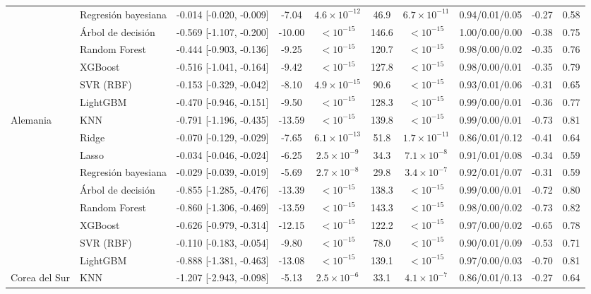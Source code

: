 \begin{longtable}{llcccccccc}
 & Regresión bayesiana & -0.014 [-0.020, -0.009] & -7.04 & $4.6\times10^{-12}$ & 46.9 & $6.7\times10^{-11}$ & 0.94/0.01/0.05 & -0.27 & 0.58 \\
 & Árbol de decisión & -0.569 [-1.107, -0.200] & -10.00 & $<10^{-15}$ & 146.6 & $<10^{-15}$ & 1.00/0.00/0.00 & -0.38 & 0.75 \\
 & Random Forest & -0.444 [-0.903, -0.136] & -9.25 & $<10^{-15}$ & 120.7 & $<10^{-15}$ & 0.98/0.00/0.02 & -0.35 & 0.76 \\
 & XGBoost & -0.516 [-1.041, -0.164] & -9.42 & $<10^{-15}$ & 127.8 & $<10^{-15}$ & 0.98/0.00/0.01 & -0.35 & 0.79 \\
 & SVR (RBF) & -0.153 [-0.329, -0.042] & -8.10 & $4.9\times10^{-15}$ & 90.6 & $<10^{-15}$ & 0.93/0.01/0.06 & -0.31 & 0.65 \\
 & LightGBM & -0.470 [-0.946, -0.151] & -9.50 & $<10^{-15}$ & 128.3 & $<10^{-15}$ & 0.99/0.00/0.01 & -0.36 & 0.77 \\
\midrule
Alemania & KNN & -0.791 [-1.196, -0.435] & -13.59 & $<10^{-15}$ & 139.8 & $<10^{-15}$ & 0.99/0.00/0.01 & -0.73 & 0.81 \\
 & Ridge & -0.070 [-0.129, -0.029] & -7.65 & $6.1\times10^{-13}$ & 51.8 & $1.7\times10^{-11}$ & 0.86/0.01/0.12 & -0.41 & 0.64 \\
 & Lasso & -0.034 [-0.046, -0.024] & -6.25 & $2.5\times10^{-9}$ & 34.3 & $7.1\times10^{-8}$ & 0.91/0.01/0.08 & -0.34 & 0.59 \\
 & Regresión bayesiana & -0.029 [-0.039, -0.019] & -5.69 & $2.7\times10^{-8}$ & 29.8 & $3.4\times10^{-7}$ & 0.92/0.01/0.07 & -0.31 & 0.59 \\
 & Árbol de decisión & -0.855 [-1.285, -0.476] & -13.39 & $<10^{-15}$ & 138.3 & $<10^{-15}$ & 0.99/0.00/0.01 & -0.72 & 0.80 \\
 & Random Forest & -0.860 [-1.306, -0.469] & -13.59 & $<10^{-15}$ & 143.3 & $<10^{-15}$ & 0.98/0.00/0.02 & -0.73 & 0.82 \\
 & XGBoost & -0.626 [-0.979, -0.314] & -12.15 & $<10^{-15}$ & 122.2 & $<10^{-15}$ & 0.97/0.00/0.02 & -0.65 & 0.78 \\
 & SVR (RBF) & -0.110 [-0.183, -0.054] & -9.80 & $<10^{-15}$ & 78.0 & $<10^{-15}$ & 0.90/0.01/0.09 & -0.53 & 0.71 \\
 & LightGBM & -0.888 [-1.381, -0.463] & -13.08 & $<10^{-15}$ & 139.1 & $<10^{-15}$ & 0.97/0.00/0.03 & -0.70 & 0.81 \\
\midrule
Corea del Sur & KNN & -1.207 [-2.943, -0.098] & -5.13 & $2.5\times10^{-6}$ & 33.1 & $4.1\times10^{-7}$ & 0.86/0.01/0.13 & -0.27 & 0.64 \\

\end{longtable}
